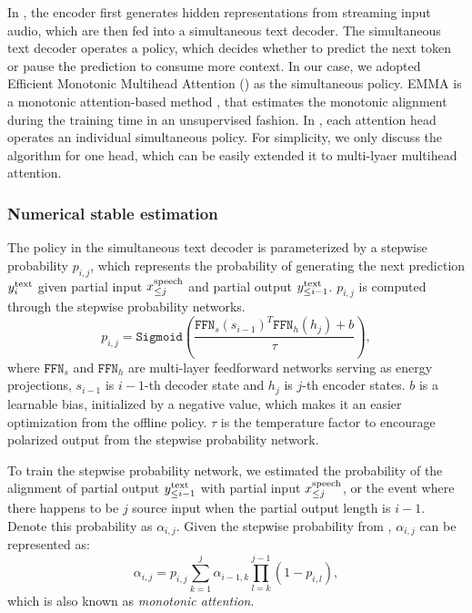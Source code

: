 In \seamlessstreaming,
the encoder first generates hidden representations from streaming input audio, which are then fed into a simultaneous text decoder.
The simultaneous text decoder operates a policy,
which decides whether to predict the next token or pause the prediction to consume more context.
In our case,
we adopted Efficient Monotonic Multihead Attention (\emma) \citep{ma_efficient_2023} as the simultaneous policy.
EMMA is a monotonic attention-based method \citep{raffel_online_2017, chiu_monotonic_2018, arivazhagan_monotonic_2019, ma_monotonic_2019},
that estimates the monotonic alignment during the training time in an unsupervised fashion.
In \emma, each attention head operates an individual simultaneous policy.
For simplicity, we only discuss the algorithm for one head, which can be easily extended it to multi-lyaer multihead attention.

\subsubsection{Numerical stable estimation}
The policy in the simultaneous text decoder is parameterized by a stepwise probability $p_{i,j}$,
which represents the probability of generating the next prediction $y^{\text{text}}_{i}$
given partial input $x^{\text{speech}}_{\leq j}$ and partial output $y^{\text{text}}_{\leq i-1}$.
$p_{i,j}$ is computed through the stepwise probability networks.
\begin{equation}
	p_{i, j} = \texttt{Sigmoid}\left(\frac{ \texttt{FFN}_s(s_{i-1})^T \texttt{FFN}_h(h_j) + b }{\tau} \right)\!,
 \label{eq:streaming.stepwise_p}
\end{equation}
where $\texttt{FFN}_s$ and $\texttt{FFN}_h$ are multi-layer feedforward networks serving as energy projections,
$s_{i-1}$ is $i-1$-th decoder state and $h_j$ is $j$-th encoder states.
$b$ is a learnable bias, initialized by a negative value, which makes it an easier optimization from the offline policy.
 $\tau$ is the temperature factor to encourage polarized output from the stepwise probability network. 

 
To train the stepwise probability network,
we estimated the probability of the alignment of partial output $y^{\text{text}}_{\leq i-1}$ with partial input $x^{\text{speech}}_{\leq j}$, or the event where there happens to be $j$ source input when the partial output length is $i-1$.
Denote this probability as $\alpha_{i,j}$.
Given the stepwise probability from , $\alpha_{i,j}$ can be represented as:  
\begin{equation}
    \label{eq:streaming.alpha_def}
    \alpha_{i,j} = p_{i,j} \sum_{k=1}^j \alpha_{i-1, k} \prod_{l=k}^{j-1}(1 - p_{i,l}),
\end{equation}
which is also known as \textit{monotonic attention}.

